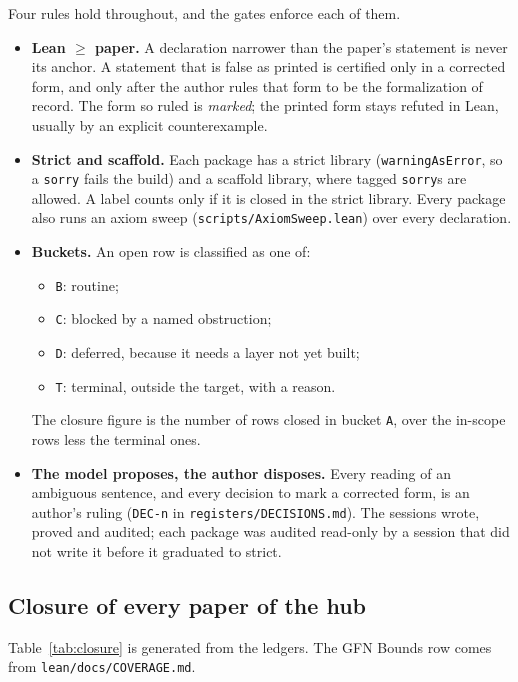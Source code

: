 Four rules hold throughout, and the gates enforce each of them.
\begin{itemize}
\item \textbf{Lean $\ge$ paper.} A declaration narrower than the paper's statement is never its
  anchor. A statement that is false as printed is certified only in a corrected form, and only
  after the author rules that form to be the formalization of record. The form so ruled is
  \emph{marked}; the printed form stays refuted in Lean, usually by an explicit counterexample.
\item \textbf{Strict and scaffold.} Each package has a strict library (\texttt{warningAsError},
  so a \texttt{sorry} fails the build) and a scaffold library, where tagged \texttt{sorry}s are
  allowed. A label counts only if it is closed in the strict library. Every package also runs an
  axiom sweep (\texttt{scripts/AxiomSweep.lean}) over every declaration.
\item \textbf{Buckets.} An open row is classified as one of:
  \begin{itemize}
  \item \texttt{B}: routine;
  \item \texttt{C}: blocked by a named obstruction;
  \item \texttt{D}: deferred, because it needs a layer not yet built;
  \item \texttt{T}: terminal, outside the target, with a reason.
  \end{itemize}
  The closure figure is the number of rows closed in bucket \texttt{A}, over the in-scope rows
  less the terminal ones.
\item \textbf{The model proposes, the author disposes.} Every reading of an ambiguous sentence,
  and every decision to mark a corrected form, is an author's ruling (\texttt{DEC-n} in
  \texttt{registers/DECISIONS.md}). The sessions wrote, proved and audited; each package was
  audited read-only by a session that did not write it before it graduated to strict.
\end{itemize}

\subsection{Closure of every paper of the hub}

Table~\ref{tab:closure} is generated from the ledgers. The GFN Bounds row comes from
\texttt{lean/docs/COVERAGE.md}.

